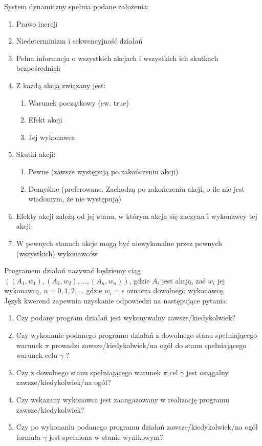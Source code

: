 \documentclass{article}
\begin{document}
System dynamiczny spełnia podane założenia:
\begin{enumerate}
\item Prawo inercji
\item Niedeterminizm i sekwencyjność działań
\item Pełna informacja o wszystkich akcjach i wszystkich ich skutkach bezpośrednich
\item Z każdą akcją związany jest:
\begin{enumerate}
\item Warunek początkowy (ew. true)
\item Efekt akcji
\item Jej wykonawca
\end{enumerate}
\item Skutki akcji:
\begin{enumerate}
\item Pewne (zawsze występują po zakończeniu akcji)
\item Domyślne (preferowane. Zachodzą po zakończeniu akcji, o ile nie jest wiadomym, że nie występują)
\end{enumerate}
\item Efekty akcji zależą od jej stanu, w którym akcja się zaczyna i wykonawcy tej akcji
\item W pewnych stanach akcje mogą być niewykonalne przez pewnych (wszystkich) wykonawców
\end{enumerate}

Programem działań nazywać będziemy ciąg $((A_{1},w_{1}), (A_{2},w_{2}), …, (A_{n},w_{n}))$, 
gdzie $A_{i}$ jest akcją, zaś $w_{i}$ jej wykonawcą, $n = 0, 1, 2, \dots$ gdzie $w_{i} = \epsilon$ oznacza dowolnego wykonawcę.\\


Język kwerend zapewnia uzyskanie odpowiedzi na następujące pytania:
\begin{enumerate}
\item Czy podany program działań jest wykonywalny zawsze/kiedykolwiek?
\item Czy wykonanie podanego programu działań z dowolnego stanu spełniającego warunek $\pi$ prowadzi zawsze/kiedykolwiek/na ogół do stanu spełniającego warunek celu $\gamma$ ?
\item Czy z dowolnego stanu spełniającego warunek $\pi$ cel $\gamma$ jest osiągalny zawsze/kiedykolwiek/na ogół?
\item Czy wskazany wykonawca jest zaangażowany w realizację programu zawsze/kiedykolwiek?
\item Czy po wykonaniu podanego programu działań zawsze/kiedykolwiek/na ogół formuła $\gamma$ jest spełniona w stanie wynikowym?
\end{enumerate}
\end{document}
